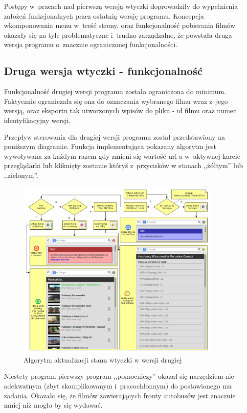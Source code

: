 Postępy w~pracach nad pierwszą wersją wtyczki doprowadziły do wypełnienia
założeń funkcjonalnych przez ostatnią wersję programu. Koncepcja wkomponowania
menu w~treść strony, oraz funkcjonalność pobierania filmów okazały się
na tyle problematyczne i~trudno zarządzalne, że powstała druga wersja programu
o~znacznie ograniczonej funkcjonalności.

\subsection{Druga wersja wtyczki - funkcjonalność}

Funkcjonalność drugiej wersji programu została ograniczona do minimum. Faktycznie
ograniczała się ona do oznaczania wybranego filmu wraz z~jego wersją, oraz
eksportu tak utworzonych wpisów do pliku - id filmu oraz numer identyfikacyjny wersji.

Przepływ sterowania dla drugiej wersji programu został przedstawiony na poniższym
diagramie. Funkcja implementująca pokazany algorytm jest wywoływana za każdym razem
gdy zmieni się wartość url-a w~aktywnej karcie przeglądarki lub kliknięty zostanie
któryś z~przycisków w stanach ,,żółtym'' lub ,,zielonym''.

\begin{figure}[h!]
    \caption{Algorytm aktualizacji stanu wtyczki w wersji drugiej}
    \centering
    \includegraphics[width=0.9\textwidth]{img/env_yt_marker}
\end{figure}

Niestety program pierwszy program ,,pomocniczy'' okazał się narzędziem nie adekwatnym
(zbyt skomplikowanym i~pracochłonnym) do postawionego mu zadania. Okazało się, że
filmów zawierających fronty autobusów jest znacznie mniej niż mogło by się wydawać.

